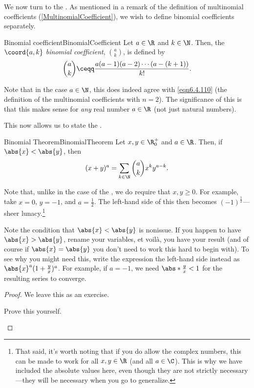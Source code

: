 We now turn to the .  As mentioned in a remark of the definition of multinomial coefficients (\cref{MultinomialCoefficient}), we wish to define binomial coefficients separately.
\begin{dfn}{Binomial coefficient}{BinomialCoefficient}
Let $a\in \R$ and $k\in \N$.  Then, the \emph{$\coord{a,k}$ binomial coefficient}, $\binom{a}{k}$, is defined by
\begin{equation}
\binom{a}{k}\ceqq \frac{a(a-1)(a-2)\cdots (a-(k+1))}{k!}.
\end{equation}
\begin{rmk}
Note that in the case $a\in \N$, this does indeed agree with \eqref{eqn6.4.110} (the definition of the multinomial coefficients with $n=2$).  The significance of this is that this makes sense for \emph{any} real number $a\in \R$ (not just natural numbers).
\end{rmk}
\end{dfn}
This now allows us to state the .
\begin{thm}{Binomial Theorem}{BinomialTheorem}
Let $x,y\in \R _0^+$ and $a\in \R$.  Then, if $\abs{x}<\abs{y}$, then
\begin{equation}
(x+y)^a=\sum _{k\in \N}\binom{a}{k}x^ky^{a-k}.
\end{equation}
\begin{rmk}
Note that, unlike in the case of the , we do require that $x,y\geq 0$.  For example, take $x=0$, $y=-1$, and $a=\frac{1}{2}$.  The left-hand side of this then becomes $(-1)^{\tfrac{1}{2}}$---sheer lunacy.\footnote{That said, it's worth noting that if you do allow the complex numbers, this can be made to work for all $x,y\in \R$ (and all $a\in \C$).  This is why we have included the absolute values here, even though they are not strictly necessary---they will be necessary when you go to generalize.}
\end{rmk}
\begin{rmk}
Note the condition that $\abs{x}<\abs{y}$ is nonissue.  If you happen to have $\abs{x}>\abs{y}$, rename your variables, et voil\`{a}, you have your result (and of course if $\abs{x}=\abs{y}$ you don't need to work this hard to begin with).  To see why you might need this, write the expression the left-hand side instead as $\abs{x}^a(1+\frac{y}{x})^a$.  For example, if $a=-1$, we need $\abs*{\frac{y}{x}}<1$ for the resulting series to converge.
\end{rmk}
\begin{proof}
We leave this as an exercise.
\begin{exr}{}{}
Prove this yourself.
\end{exr}
\end{proof}
\end{thm}

